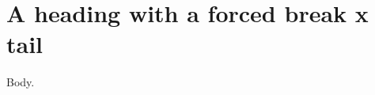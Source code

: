 \documentclass{article}
\begin{document}
\section{A heading with a forced break \texorpdfstring{x}{x} \\ tail}

Body.
\end{document}
